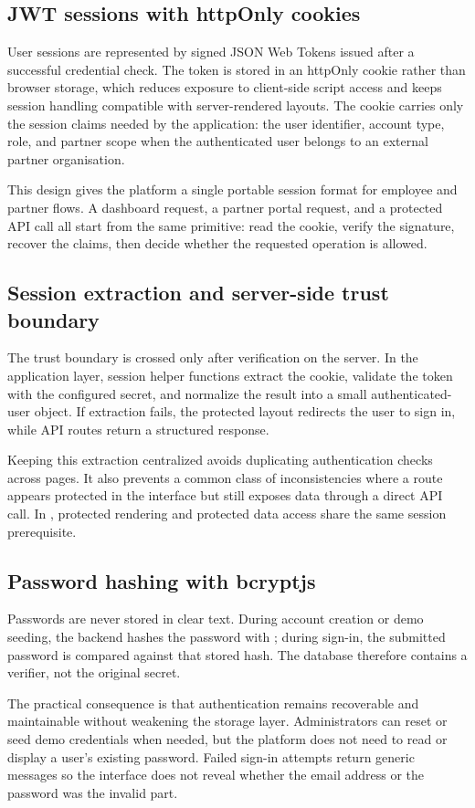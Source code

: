\subsection{JWT sessions with httpOnly cookies}
User sessions are represented by signed JSON Web Tokens issued after a successful credential check. The token is stored in an httpOnly cookie rather than browser storage, which reduces exposure to client-side script access and keeps session handling compatible with server-rendered layouts. The cookie carries only the session claims needed by the application: the user identifier, account type, role, and partner scope when the authenticated user belongs to an external partner organisation.

This design gives the platform a single portable session format for employee and partner flows. A dashboard request, a partner portal request, and a protected API call all start from the same primitive: read the cookie, verify the signature, recover the claims, then decide whether the requested operation is allowed.
\subsection{Session extraction and server-side trust boundary}
The trust boundary is crossed only after verification on the server. In the application layer, session helper functions extract the cookie, validate the token with the configured secret, and normalize the result into a small authenticated-user object. If extraction fails, the protected layout redirects the user to sign in, while API routes return a structured  response.

Keeping this extraction centralized avoids duplicating authentication checks across pages. It also prevents a common class of inconsistencies where a route appears protected in the interface but still exposes data through a direct API call. In \projectname{}, protected rendering and protected data access share the same session prerequisite.
\subsection{Password hashing with bcryptjs}
Passwords are never stored in clear text. During account creation or demo seeding, the backend hashes the password with ; during sign-in, the submitted password is compared against that stored hash. The database therefore contains a verifier, not the original secret.

The practical consequence is that authentication remains recoverable and maintainable without weakening the storage layer. Administrators can reset or seed demo credentials when needed, but the platform does not need to read or display a user's existing password. Failed sign-in attempts return generic messages so the interface does not reveal whether the email address or the password was the invalid part.
